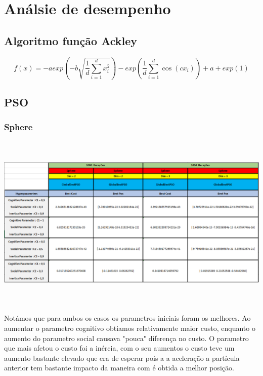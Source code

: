 \documentclass[10pt]{article}
\begin{document}
\section{Análsie de desempenho}\label{sec:an-do-desem}
\subsection{Algoritmo função Ackley }\label{sec:alg-Ackley}
\begin{equation}
  f(x) = -aexp(-b\sqrt{\frac{1}{d}\sum_{i = 1}^{d}x^2_i}) - exp(\frac{1}{d}\sum_{i = 1}^{d}\cos(cx_i)) + a + exp(1)
\end{equation}

\subsection{PSO}\label{sec:PSO-res}
\subsubsection{Sphere}\label{sec:comp-PSO:center}
\begin{center}
  \includegraphics[height=8.5cm]{img/PSOsphere.png}
\end{center}
    Notámos que para ambos os casos os parametros iniciais
    foram os melhores. Ao aumentar o parametro cognitivo obtiamos
    relativamente maior custo, enquanto o aumento do parametro
    social causava "pouca" diferença no custo. O parametro que
    mais afetou o custo foi a inércia, com o seu aumentos o
    custo teve um aumento bastante elevado que era de esperar
    pois a a aceleração a partícula anterior tem bastante impacto
    da maneira com é obtida a melhor posição.
\end{document}
